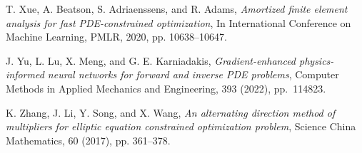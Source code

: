 \documentclass[final]{siamart171218}
\theoremstyle{remark}
\begin{document}
\begin{thebibliography}{10}
T. Xue, A. Beatson, S. Adriaenssens, and R. Adams,  {\em Amortized finite element analysis for fast PDE-constrained optimization}, In International Conference on Machine Learning, PMLR, 2020, pp. 10638--10647.
	
	J. Yu, L. Lu, X. Meng, and G. E. Karniadakis, {\em Gradient-enhanced physics-informed neural networks for forward and inverse PDE problems}, Computer Methods in Applied Mechanics and Engineering, 393 (2022), pp.~114823.
	
	
	K. Zhang, J. Li, Y. Song,  and X. Wang, {\em An alternating direction method of multipliers
	for elliptic equation constrained optimization problem}, Science China Mathematics, 60 (2017),
	pp. 361--378.

	

	

	



	
	



	

	

	

	


	
	

	

	
	

	
	

	

	
\end{thebibliography}
\end{document}
